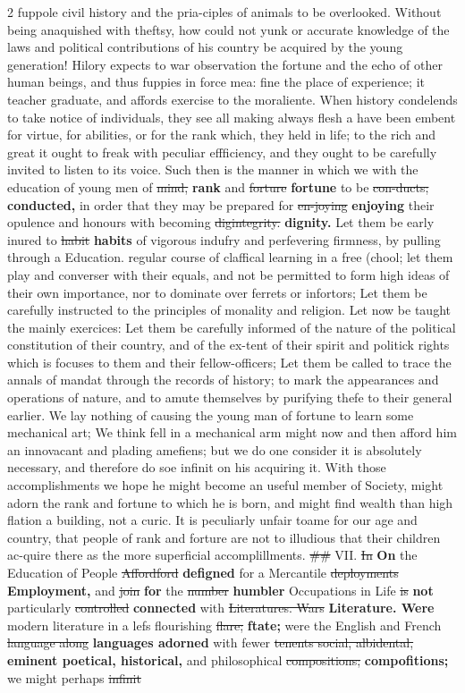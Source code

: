 \documentclass[10pt]{article}
\begin{document}
\begin{multicols}{2}
fuppole civil history and the pria-ciples of animals to be overlooked. Without being anaquished with theftsy, how could not yunk or accurate knowledge of the laws and political contributions of his country be acquired by the young generation! Hilory expects to war observation the fortune and the echo of other human beings, and thus fuppies in force mea: fine the place of experience; it teacher graduate, and affords exercise to the moraliente. When history condelends to take notice of individuals, they see all making always flesh a have been embent for virtue, for abilities, or for the rank which, they held in life; to the rich and great it ought to freak with peculiar effficiency, and they ought to be carefully invited to listen to its voice. Such then is the manner in which we with the education of young men of \sout{mind,} \textbf{rank} and \sout{forture} \textbf{fortune} to be \sout{con-ducts;} \textbf{conducted,} in order that they may be prepared for \sout{en-joying} \textbf{enjoying} their opulence and honours with becoming \sout{digintegrity.} \textbf{dignity.} Let them be early inured to \sout{habit} \textbf{habits} of vigorous indufry and perfevering firmness, by pulling through a Education. regular course of claffical learning in a free (chool; let them play and converser with their equals, and not be permitted to form high ideas of their own importance, nor to dominate over ferrets or infortors; Let them be carefully instructed to the principles of monality and religion. Let now be taught the mainly exercices: Let them be carefully informed of the nature of the political constitution of their country, and of the ex-tent of their spirit and politick rights which is focuses to them and their fellow-officers; Let them be called to trace the annals of mandat through the records of history; to mark the appearances and operations of nature, and to amute themselves by purifying thefe to their general earlier. We lay nothing of causing the young man of fortune to learn some mechanical art; We think fell in a mechanical arm might now and then afford him an innovacant and plading amefiens; but we do one consider it is absolutely necessary, and therefore do soe infinit on his acquiring it. With those accomplishments we hope he might become an useful member of Society, might adorn the rank and fortune to which he is born, and might find wealth than high flation a building, not a curic. It is peculiarly unfair toame for our age and country, that people of rank and forture are not to illudious that their children ac-quire there as the more superficial accomplillments. \sout{\#\#} VII. \sout{In} \textbf{On} the Education of People \sout{Affordford} \textbf{defigned} for a Mercantile \sout{deployments} \textbf{Employment,} and \sout{join} \textbf{for} the \sout{number} \textbf{humbler} Occupations in Life \sout{is} \textbf{not} particularly \sout{controlled} \textbf{connected} with \sout{Literatures. Wars} \textbf{Literature. Were} modern literature in a lefs flourishing \sout{flare;} \textbf{ftate;} were the English and French \sout{language along} \textbf{languages adorned} with fewer \sout{tenents social, albidental,} \textbf{eminent poetical, historical,} and philosophical \sout{compositions;} \textbf{compofitions;} we might perhaps \sout{infinit} 
\end{multicols}
\end{document}
